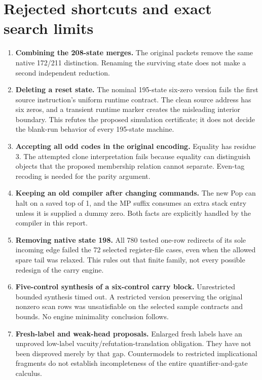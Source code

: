 \documentclass[11pt,a4paper]{article}
\begin{document}
\section{Rejected shortcuts and exact search limits}
\begin{enumerate}
\item \textbf{Combining the 208-state merges.} The original packets remove
the same native 172/211 distinction. Renaming the surviving state does not
make a second independent reduction.
\item \textbf{Deleting a reset state.} The nominal 195-state six-zero
version fails the first source instruction's uniform runtime contract.
The clean source address has six zeros, and a transient runtime marker
creates the misleading interior boundary. This refutes the proposed
simulation certificate; it does not decide the blank-run behavior of
every 195-state machine.
\item \textbf{Accepting all odd codes in the original encoding.}
Equality has residue 3. The attempted clone interpretation fails because
equality can distinguish objects that the proposed membership relation
cannot separate. Even-tag recoding is needed for the parity argument.
\item \textbf{Keeping an old compiler after changing commands.} The new
Pop can halt on a saved top of 1, and the MP suffix consumes an extra stack
entry unless it is supplied a dummy zero. Both facts are explicitly handled
by the compiler in this report.
\item \textbf{Removing native state 198.} All 780 tested one-row redirects
of its sole incoming edge failed the 72 selected register-file cases, even
when the allowed spare tail was relaxed. This rules out that finite family,
not every possible redesign of the carry engine.
\item \textbf{Five-control synthesis of a six-control carry block.}
Unrestricted bounded synthesis timed out. A restricted version preserving
the original nonzero scan rows was unsatisfiable on the selected sample
contracts and bounds. No engine minimality conclusion follows.
\item \textbf{Fresh-label and weak-head proposals.} Enlarged fresh labels
have an unproved low-label vacuity/refutation-translation obligation. They
have not been disproved merely by that gap. Countermodels to restricted
implicational fragments do not establish incompleteness of the entire
quantifier-and-gate calculus.
\end{enumerate}
\end{document}
